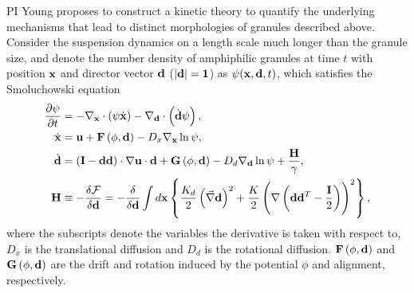 %
PI Young proposes to construct a kinetic theory to quantify the underlying mechanisms that lead to distinct morphologies of granules described above.
Consider the suspension dynamics on a length scale much longer than the granule size, and denote the number density of 
amphiphilic granules at time $t$ with position ${\bf x}$ and director vector ${\bf d}$ ($|\bf d|=1$) as $\psi({\bf x}, {\bf d},t)$, which satisfies the 
Smoluchowski equation 
\begin{align}
\frac{\partial \psi}{\partial t} &= -\nabla_{\bf x} \cdot\left(\psi\dot{\bf x}\right) - \nabla_{\bf d}\cdot\left(\dot{\bf d}\psi\right),\\
\dot{\bf x} &= {\bf u} + {\bf F}\left(\phi,{\bf d}\right) - D_x\nabla_{\bf x}\ln\psi,\\
\label{eq:dpdt}
\dot{\bf d} &= \left({\bf I}-{\bf d}{\bf d}\right)\cdot\nabla {\bf u}\cdot {\bf d} + {\bf G}\left(\phi,{\bf d}\right) - D_d \nabla_{\bf d}\ln \psi + \frac{{\bf H}}{\gamma},\\
{\bf H} &\equiv -\frac{\delta {\cal F}}{\delta {\bf d}} = -\frac{\delta}{\delta {\bf d}} 
\int d{\bf x} \left\{\frac{K_d}{2} \left(\vec\nabla{\bf d}\right)^2 + \frac{K}{2}\left(\nabla\left({\bf d}{\bf d}^T- \frac{\bf I}{2}\right)\right)^2\right\},
\end{align}
where the subscripts denote the variables the derivative is taken with respect to, 
$D_x$ is the translational diffusion and $D_d$ is the rotational diffusion. 
 ${\bf F}\left(\phi,{\bf d}\right)$ and ${\bf G}\left(\phi,{\bf d}\right)$ are the drift and rotation induced by the potential $\phi$ and alignment, respectively.
